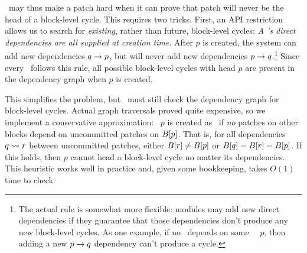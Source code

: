 \Featherstitch\ may thus make a patch hard when it can prove that patch
 will never be the head of a block-level cycle.
%
This requires two tricks.
%
First, an API restriction allows us to search for \emph{existing},
 rather than future, block-level cycles:
%
\emph{A \patch's direct dependencies are all supplied at creation time}.
%
After $p$ is created, the system can add new dependencies $q \rightarrow p$,
 but will never add new dependencies $p \rightarrow q$.\footnote{The actual
 rule is somewhat more flexible: modules may add new direct dependencies if
 they guarantee that those dependencies don't produce any new block-level
 cycles.  As one example, if no \patch\ depends on some \noop\ \patch\ $p$,
 then adding a new $p \rightarrow q$ dependency can't produce a cycle.}
%
Since every \patch\ follows this rule, all possible block-level cycles with
 head $p$ are present in the dependency graph when $p$ is created.


This simplifies the problem, but \Featherstitch\ must still check the
 dependency graph for block-level cycles.
%
Actual graph traversals proved quite expensive, so
%
we implement a conservative approximation: \patch\ $p$ is
created as \nrb\ if \emph{no} patches on other blocks depend on uncommitted
 patches on $B[{p}]$.
%
That is, for all dependencies $q \leadsto r$ between uncommitted patches,
 either $B[{r}] \neq B[{p}]$ or $B[{q}] = B[{r}] = B[{p}]$.
%
If this holds, then $p$ cannot head a block-level cycle no matter its
 dependencies.
%
This heuristic works well in practice and, given some bookkeeping, 
 takes $O(1)$ time to check.


\begin{comment}
\Kudos\ further ensures that the dependency structure correctly
represents dependencies on the same block through overlap
dependencies: since \nrb\ \patches\ are considered to cover the entire
block, every succeeding \patch\ will overlap at least one \nrb\ \patch,
and \Kudos\ will automatically add a dependency.
%
(Some cases are handled by other optimizations.)


The buffer cache's ``write block'' behavior must account for \nrb\
\patches, as it \emph{must} write any \nrb\ \patches\ that exist on a
block.
%
Let $\PHard[b]$ be the set of \nrb\ \patches\ on block $b$.
%
Then to write block $b$, the buffer cache must choose some $P \subseteq
\PMem[b]$ with
%
\[ \PDepset{P} \subseteq P \cup \PDisk \text{ and } \PHard[b] \cap \PMem
\subseteq P. \]
%
If no such $P$ exists, then the cache must write a different block.
\end{comment}


